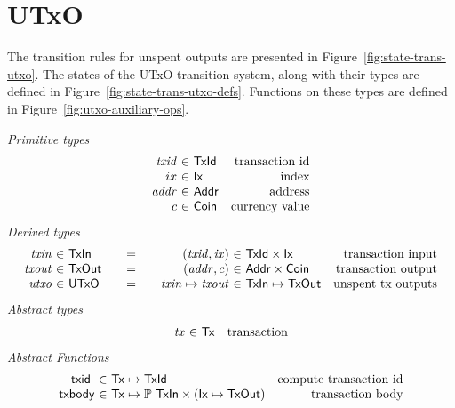 \documentclass[11pt,a4paper]{article}
\newcommand{\powerset}[1]{\mathbb{P}~#1}
\newcommand{\var}[1]{\mathit{#1}}
\newcommand{\fun}[1]{\mathsf{#1}}
\newcommand{\type}[1]{\mathsf{#1}}
\newcommand{\Tx}{\type{Tx}}
\newcommand{\Ix}{\type{Ix}}
\newcommand{\TxId}{\type{TxId}}
\newcommand{\Addr}{\type{Addr}}
\newcommand{\UTxO}{\type{UTxO}}
\newcommand{\Coin}{\type{Coin}}
\newcommand{\TxIn}{\type{TxIn}}
\newcommand{\TxOut}{\type{TxOut}}
\newcommand{\txid}[1]{\fun{txid}~ \var{#1}}
\begin{document}
\section{UTxO}
\label{sec:state-trans-utxo-1}

The transition rules for unspent outputs are presented in
Figure~\ref{fig:state-trans-utxo}. The states of the UTxO transition system,
along with their types are defined in Figure~\ref{fig:state-trans-utxo-defs}.
Functions on these types are defined in Figure~\ref{fig:utxo-auxiliary-ops}.

\begin{figure*}
  \emph{Primitive types}
  \begin{equation*}
    \begin{array}{r@{~\in~}lr}
      \var{txid} & \TxId & \text{transaction id}\\
      ix & \Ix & \text{index}\\
      \var{addr} & \Addr & \text{address}\\
      c & \Coin & \text{currency value}
    \end{array}
  \end{equation*}
  \emph{Derived types}
  \begin{equation*}
    \begin{array}{r@{~\in~}l@{\qquad=\qquad}r@{~\in~}lr}
      \var{txin}
      & \TxIn
      & (\var{txid}, \var{ix})
      & \TxId \times \Ix
      & \text{transaction input}
      \\
      \var{txout}
      & \type{TxOut}
      & (\var{addr}, c)
      & \Addr \times \Coin
      & \text{transaction output}
      \\
      \var{utxo}
      & \UTxO
      & \var{txin} \mapsto \var{txout}
      & \TxIn \mapsto \TxOut
      & \text{unspent tx outputs}
    \end{array}
  \end{equation*}
  \emph{Abstract types}
  \begin{equation*}
    \begin{array}{r@{~\in~}lr}
      \var{tx} & \Tx & \text{transaction}\\
    \end{array}
  \end{equation*}
  \emph{Abstract Functions}
  \begin{equation*}
    \begin{array}{r@{~\in~}lr}
      \txid{} & \Tx \mapsto \TxId & \text{compute transaction id}\\
      \fun{txbody} & \Tx \mapsto \powerset{\TxIn} \times (\Ix \mapsto \TxOut)
                                  & \text{transaction body}
    \end{array}
  \end{equation*}
  \caption{Definitions used in the UTxO transition system}
  \label{fig:state-trans-utxo-defs}
\end{figure*}
\end{document}
